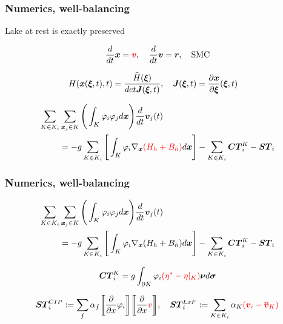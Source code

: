 \documentclass[pt12]{beamer}
\newcommand{\uvec}[2][3]{\boldsymbol{#2\mkern-#1mu}\mkern#1mu}
\begin{document}
\begin{frame}
\frametitle{Numerics, well-balancing}

Lake at rest is exactly preserved

\begin{align*}
\frac{d}{dt}\uvec{x}=\textcolor{red}{\uvec{v}}, \quad \frac{d}{dt}\uvec{v}=\uvec{r}, \quad \text{SMC}
\end{align*}

\begin{align*}
&H(\uvec{x}(\uvec{\xi},t),t)=\frac{\widehat{H}(\uvec{\xi})}{det \uvec{J}(\uvec{\xi},t)}, \quad \uvec{J}(\uvec{\xi},t)=\frac{\partial \uvec{x}}{\partial \uvec{\xi}}(\uvec{\xi},t)
\end{align*}

\begin{align*}
\sum_{K \in K_i} & \sum_{\uvec{x}_j \in K} \Bigg(\int_K \varphi_i \varphi_j d \uvec{x}\Bigg) \frac{d}{dt}\uvec{v}_j(t)\\
&= -g \sum_{K \in K_i} \Bigg[ \int_K \varphi_i \nabla_{\uvec{x}}\textcolor{red}{(H_h+B_h)}  d\uvec{x}\Bigg] - \sum_{K \in K_i} \uvec{CT}_i^K -\uvec{ST}_i
\end{align*}

\end{frame}


\begin{frame}
\frametitle{Numerics, well-balancing}

\begin{align*}
\sum_{K \in K_i} & \sum_{\uvec{x}_j \in K} \Bigg(\int_K \varphi_i \varphi_j d \uvec{x}\Bigg) \frac{d}{dt}\uvec{v}_j(t)\\
&= -g \sum_{K \in K_i} \Bigg[ \int_K \varphi_i \nabla_{\uvec{x}}\textcolor{black}{(H_h+B_h)}  d\uvec{x}\Bigg] - \sum_{K \in K_i} \uvec{CT}_i^K -\uvec{ST}_i
\end{align*}


\begin{align*}
\uvec{CT}_i^K=g\int_{\partial K} \varphi_i \textcolor{red}{(\eta^*-\eta\vert_K)} \uvec{\nu} d \uvec{\sigma}
\end{align*}



\begin{align*}
\uvec{ST}^{CIP}_i:=\sum_{f}\alpha_f  \biggl\llbracket \frac{\partial}{\partial x} \varphi_i\biggr\rrbracket  \biggl\llbracket \frac{\partial}{\partial x} \textcolor{red}{v} \biggr\rrbracket, \quad \uvec{ST}^{LxF}_i:= \sum_{K \in K_i} \alpha_K \textcolor{red}{(\uvec{v}_i-\overline{\uvec{v}}_K)}
\end{align*}


\end{frame}
\end{document}
